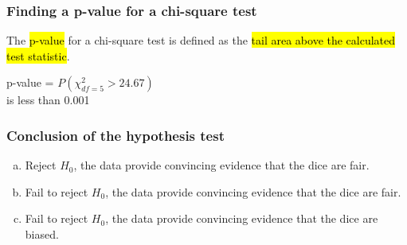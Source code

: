 \documentclass[notes,11pt, aspectratio=169]{beamer}
\begin{document}

\begin{frame}
\frametitle{Finding a p-value for a chi-square test}

The \hl{p-value} for a chi-square test is defined as the \hl{tail area above the calculated test statistic}.

{
p-value = $P(\chi^2_{df = 5} > 24.67)$\\ is less than 0.001
}

\end{frame}


\begin{frame}
\frametitle{Conclusion of the hypothesis test}


\begin{enumerate}[(a)]
\item Reject $H_0$, the data provide convincing evidence that the dice are fair.
\item Fail to reject $H_0$, the data provide convincing evidence that the dice are fair.
\item Fail to reject $H_0$, the data provide convincing evidence that the dice are biased.
\end{enumerate}

\end{frame}

\end{document}
